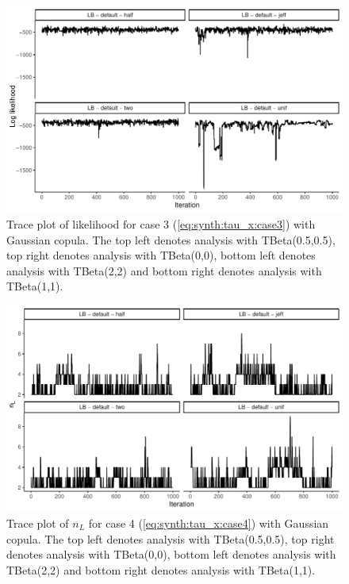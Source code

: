 \documentclass{amsart}
\begin{document}
\begin{figure}
	\centering
	\includegraphics[width = 0.75\linewidth]{trace_case3_gauss_like.pdf}
	\caption{Trace plot of likelihood for case 3 (\cref{eq:synth:tau_x:case3}) with Gaussian copula. The top left denotes analysis with TBeta(0.5,0.5), top right denotes analysis with TBeta(0,0), bottom left denotes analysis with TBeta(2,2) and bottom right denotes analysis with TBeta(1,1).}
	\label{fig:case3:gauss:like}
\end{figure}

\begin{figure}
	\centering
	\includegraphics[width = 0.75\linewidth]{trace_case4_gauss_nterm.pdf}
	\caption{Trace plot of $n_L$ for case 4 (\cref{eq:synth:tau_x:case4}) with Gaussian copula. The top left denotes analysis with TBeta(0.5,0.5), top right denotes analysis with TBeta(0,0), bottom left denotes analysis with TBeta(2,2) and bottom right denotes analysis with TBeta(1,1).}
	\label{fig:case4:gauss:nterm}
\end{figure}
\end{document}
